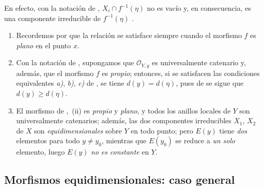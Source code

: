 En efecto, con la notación de , $X_i\cap f^{-1}(\eta)$ no es vacío y, en consecuencia, es una componente irreducible de $f^{-1}(\eta)$ .

\begin{remarks}[13.2.12]
\label{IV.13.2.12}
\begin{enumerate}[label=(\roman*)]
  \item Recordemos por  que la relación  se satisface siempre cuando el morfismo $f$ es \emph{plano} en el punto $x$.
  \item Con la notación de , supongamos que $\mathcal O_{Y,y}$ es universalmente catenario y, además, que el morfismo $f$ es \emph{propio}; entonces, si se satisfacen las condiciones equivalentes \emph{a)}, \emph{b)}, \emph{c)} de , se tiene $d(y)=d(\eta)$, pues de  se sigue que $d(y)\geq d(\eta)$.
  \item El morfismo de ,~(ii) es \emph{propio} y \emph{plano}, y todos los anillos locales de $Y$ son universalmente catenarios; además, las dos componentes irreducibles $X_1$, $X_2$ de $X$ son \emph{equidimensionales} sobre $Y$ en todo punto; pero $E(y)$ tiene \emph{dos} elementos para todo $y\neq y_0$, mientras que $E(y_0)$ se reduce a \emph{un solo} elemento, luego $E(y)$ \emph{no es constante} en $Y$.
\end{enumerate}
\end{remarks}

\subsection{Morfismos equidimensionales: caso general}
\label{subsection:IV.13.3}


